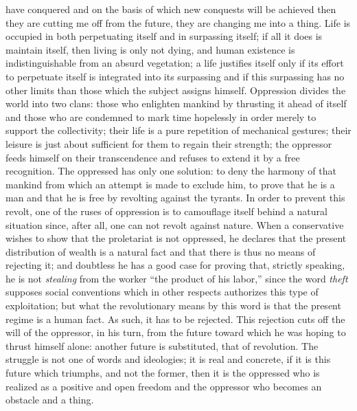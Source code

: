 \documentclass[11pt]{article}
\begin{document}
{{have conquered and on the basis of which new conquests will be achieved then they are cutting me off from the future, they are changing me into a thing. Life is occupied in both perpetuating itself and in surpassing itself; if all it does is maintain itself, then living is only not dying, and human existence is indistinguishable from an absurd vegetation; a life justifies itself only if its effort to perpetuate itself is integrated into its surpassing and if this surpassing has no other limits than those which the subject assigns himself. Oppression divides the world into two clans: those who enlighten mankind by thrusting it ahead of itself and those who are condemned to mark time hopelessly in order merely to support the collectivity; their life is a pure repetition of mechanical gestures; their leisure is just about sufficient for them to regain their strength; the oppressor feeds himself on their transcendence and refuses to extend it by a free recognition. The oppressed has only one solution: to deny the harmony of that mankind from which an attempt is made to exclude him, to prove that he is a man and that he is free by revolting against the tyrants. In order to prevent this revolt, one of the ruses of oppression is to camouflage itself behind a natural situation since, after all, one can not revolt against nature. When a conservative wishes to show that the proletariat is not oppressed, he declares that the present distribution of wealth is a natural fact and that there is thus no means of rejecting it; and doubtless he has a good case for proving that, strictly speaking, he is not \textit{stealing} from the worker “the product of his labor,” since the word \textit{theft} supposes social conventions which in other respects authorizes this type of exploitation; but what the revolutionary means by this word is that the present regime is a human fact. As such, it has to be rejected. This rejection cuts off the will of the oppressor, in his turn, from the future toward which he was hoping to thrust himself alone: another future is substituted, that of revolution. The struggle is not one of words and ideologies; it is real and concrete, if it is this future which triumphs, and not the former, then it is the oppressed who is realized as a positive and open freedom and the oppressor who becomes an obstacle and a thing.

}}
\end{document}
